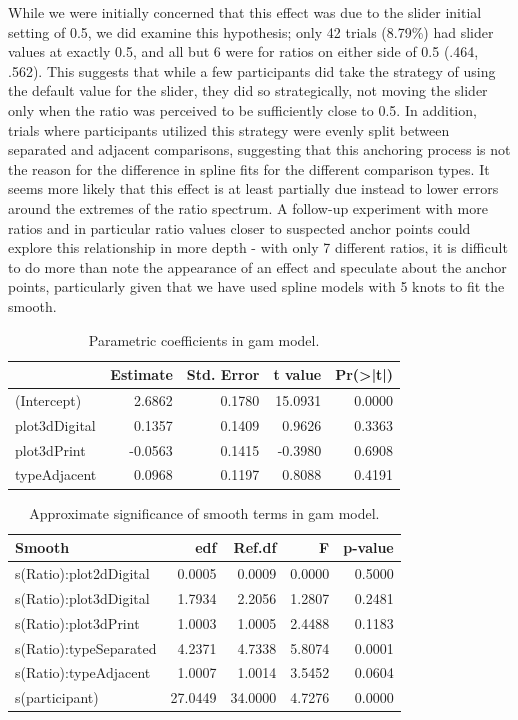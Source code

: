 \documentclass[letterpaper,inpress,dvipsnames]{jdsart}
\begin{document}
While we were initially concerned that this effect was due to the slider initial setting of 0.5, we did examine this hypothesis; only 42 trials (8.79\%) had slider values at exactly 0.5, and all but 6 were for ratios on either side of 0.5 (.464, .562). This suggests that while a few participants did take the strategy of using the default value for the slider, they did so strategically, not moving the slider only when the ratio was perceived to be sufficiently close to 0.5. In addition, trials where participants utilized this strategy were evenly split between separated and adjacent comparisons, suggesting that this anchoring process is not the reason for the difference in spline fits for the different comparison types. It seems more likely that this effect is at least partially due instead to lower errors around the extremes of the ratio spectrum. A follow-up experiment with more ratios and in particular ratio values closer to suspected anchor points could explore this relationship in more depth - with only 7 different ratios, it is difficult to do more than note the appearance of an effect and speculate about the anchor points, particularly given that we have used spline models with 5 knots to fit the smooth.

\begin{table}

\caption{\label{tab:gam-param}Parametric coefficients in gam model.}
\centering
\begin{tabular}[t]{lrrrr}
\toprule
  & Estimate & Std. Error & t value & Pr(>|t|)\\
\midrule
(Intercept) & 2.6862 & 0.1780 & 15.0931 & 0.0000\\
plot3dDigital & 0.1357 & 0.1409 & 0.9626 & 0.3363\\
plot3dPrint & -0.0563 & 0.1415 & -0.3980 & 0.6908\\
typeAdjacent & 0.0968 & 0.1197 & 0.8088 & 0.4191\\
\bottomrule
\end{tabular}
\end{table}

\begin{table}

\caption{\label{tab:gam-smooth}Approximate significance of smooth terms in gam model.}
\centering
\begin{tabular}[t]{lrrrr}
\toprule
Smooth & edf & Ref.df & F & p-value\\
\midrule
s(Ratio):plot2dDigital & 0.0005 & 0.0009 & 0.0000 & 0.5000\\
s(Ratio):plot3dDigital & 1.7934 & 2.2056 & 1.2807 & 0.2481\\
s(Ratio):plot3dPrint & 1.0003 & 1.0005 & 2.4488 & 0.1183\\
s(Ratio):typeSeparated & 4.2371 & 4.7338 & 5.8074 & 0.0001\\
s(Ratio):typeAdjacent & 1.0007 & 1.0014 & 3.5452 & 0.0604\\
\addlinespace
s(participant) & 27.0449 & 34.0000 & 4.7276 & 0.0000\\
\bottomrule
\end{tabular}
\end{table}
\end{document}
